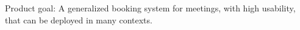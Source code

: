 Product goal:
A generalized booking system for meetings, with high usability, that can be deployed in many contexts. 
